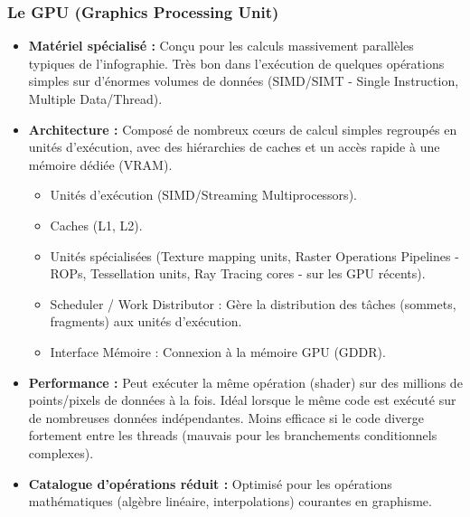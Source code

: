 \documentclass{article}
\begin{document}
\subsubsection{Le GPU (Graphics Processing Unit)}
\begin{itemize}
    \item \textbf{Matériel spécialisé :} Conçu pour les calculs massivement parallèles typiques de l'infographie. Très bon dans l'exécution de quelques opérations simples sur d'énormes volumes de données (SIMD/SIMT - Single Instruction, Multiple Data/Thread).
    \item \textbf{Architecture :} Composé de nombreux cœurs de calcul simples regroupés en unités d'exécution, avec des hiérarchies de caches et un accès rapide à une mémoire dédiée (VRAM).
    \begin{itemize}
        \item Unités d'exécution (SIMD/Streaming Multiprocessors).
        \item Caches (L1, L2).
        \item Unités spécialisées (Texture mapping units, Raster Operations Pipelines - ROPs, Tessellation units, Ray Tracing cores - sur les GPU récents).
        \item Scheduler / Work Distributor : Gère la distribution des tâches (sommets, fragments) aux unités d'exécution.
        \item Interface Mémoire : Connexion à la mémoire GPU (GDDR).
    \end{itemize}
    \item \textbf{Performance :} Peut exécuter la même opération (shader) sur des millions de points/pixels de données à la fois. Idéal lorsque le même code est exécuté sur de nombreuses données indépendantes. Moins efficace si le code diverge fortement entre les threads (mauvais pour les branchements conditionnels complexes).
    \item \textbf{Catalogue d'opérations réduit :} Optimisé pour les opérations mathématiques (algèbre linéaire, interpolations) courantes en graphisme.
\end{itemize}
\end{document}
